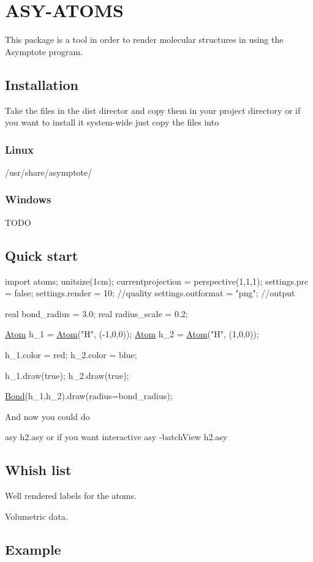 \section*{A\+S\+Y-\/\+A\+T\+O\+M\+S}

This package is a tool in order to render molecular structures in using the Asymptote program.

\subsection*{Installation}

Take the files in the {\ttfamily dist} director and copy them in your project directory or if you want to install it system-\/wide just copy the files into

\subsubsection*{Linux}

{\ttfamily /usr/share/asymptote/}

\subsubsection*{Windows}

T\+O\+D\+O

\subsection*{Quick start}


\begin{DoxyCode}
\textcolor{keyword}{import} atoms;
unitsize(1cm);
currentprojection = perspective(1,1,1);
settings.prc       = \textcolor{keyword}{false};
settings.render    = 10; \textcolor{comment}{//quality}
settings.outformat = \textcolor{stringliteral}{"png"}; \textcolor{comment}{//output }

real bond\_radius = 3.0;
real radius\_scale = 0.2;

\hyperlink{structAtom}{Atom} h\_1 = \hyperlink{structAtom}{Atom}(\textcolor{stringliteral}{"H"}, (-1,0,0));
\hyperlink{structAtom}{Atom} h\_2 = \hyperlink{structAtom}{Atom}(\textcolor{stringliteral}{"H"}, (1,0,0));

h\_1.color = red;
h\_2.color = blue;

h\_1.draw(\textcolor{keyword}{true});
h\_2.draw(\textcolor{keyword}{true});

\hyperlink{structBond}{Bond}(h\_1,h\_2).draw(radius=bond\_radius);
\end{DoxyCode}


And now you could do

{\ttfamily asy h2.\+asy} or if you want interactive {\ttfamily asy -\/batch\+View h2.\+asy}



\subsection*{Whish list}


\begin{DoxyItemize}
\item Well rendered labels for the atoms.
\item Volumetric data.
\end{DoxyItemize}

\subsection*{Example}

 